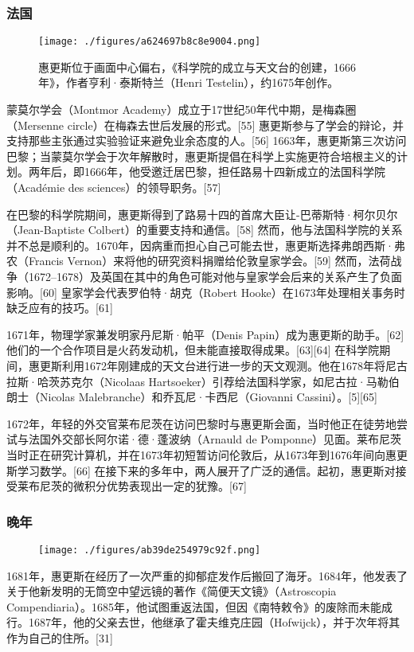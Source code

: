 \subsubsection{法国}
\begin{figure}[ht]
\centering
\texttt{[image: ./figures/a624697b8c8e9004.png]}
\caption{惠更斯位于画面中心偏右，《科学院的成立与天文台的创建，1666年》，作者亨利·泰斯特兰（Henri Testelin），约1675年创作。} \label{fig_HGS_5}
\end{figure}
蒙莫尔学会（Montmor Academy）成立于17世纪50年代中期，是梅森圈（Mersenne circle）在梅森去世后发展的形式。[55] 惠更斯参与了学会的辩论，并支持那些主张通过实验验证来避免业余态度的人。[56] 1663年，惠更斯第三次访问巴黎；当蒙莫尔学会于次年解散时，惠更斯提倡在科学上实施更符合培根主义的计划。两年后，即1666年，他受邀迁居巴黎，担任路易十四新成立的法国科学院（Académie des sciences）的领导职务。[57]

在巴黎的科学院期间，惠更斯得到了路易十四的首席大臣让-巴蒂斯特·柯尔贝尔（Jean-Baptiste Colbert）的重要支持和通信。[58] 然而，他与法国科学院的关系并不总是顺利的。1670年，因病重而担心自己可能去世，惠更斯选择弗朗西斯·弗农（Francis Vernon）来将他的研究资料捐赠给伦敦皇家学会。[59] 然而，法荷战争（1672–1678）及英国在其中的角色可能对他与皇家学会后来的关系产生了负面影响。[60] 皇家学会代表罗伯特·胡克（Robert Hooke）在1673年处理相关事务时缺乏应有的技巧。[61]

1671年，物理学家兼发明家丹尼斯·帕平（Denis Papin）成为惠更斯的助手。[62] 他们的一个合作项目是火药发动机，但未能直接取得成果。[63][64] 在科学院期间，惠更斯利用1672年刚建成的天文台进行进一步的天文观测。他在1678年将尼古拉斯·哈茨苏克尔（Nicolaas Hartsoeker）引荐给法国科学家，如尼古拉·马勒伯朗士（Nicolas Malebranche）和乔瓦尼·卡西尼（Giovanni Cassini）。[5][65]

1672年，年轻的外交官莱布尼茨在访问巴黎时与惠更斯会面，当时他正在徒劳地尝试与法国外交部长阿尔诺·德·蓬波纳（Arnauld de Pomponne）见面。莱布尼茨当时正在研究计算机，并在1673年初短暂访问伦敦后，从1673年到1676年间向惠更斯学习数学。[66] 在接下来的多年中，两人展开了广泛的通信。起初，惠更斯对接受莱布尼茨的微积分优势表现出一定的犹豫。[67]
\subsubsection{晚年}
\begin{figure}[ht]
\centering
\texttt{[image: ./figures/ab39de254979c92f.png]}
\caption{} \label{fig_HGS_6}
\end{figure}
1681年，惠更斯在经历了一次严重的抑郁症发作后搬回了海牙。1684年，他发表了关于他新发明的无筒空中望远镜的著作《简便天文镜》（Astroscopia Compendiaria）。1685年，他试图重返法国，但因《南特敕令》的废除而未能成行。1687年，他的父亲去世，他继承了霍夫维克庄园（Hofwijck），并于次年将其作为自己的住所。[31]


